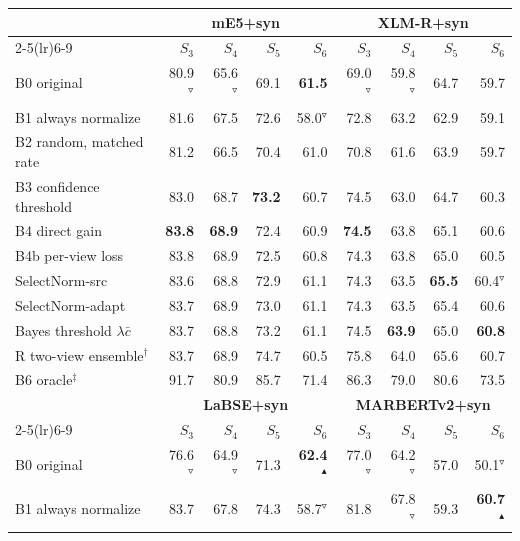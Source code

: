 \begin{tabular}{@{}lrrrrrrrr@{}}\toprule
 & \multicolumn{4}{c}{\textbf{mE5+syn}} & \multicolumn{4}{c}{\textbf{XLM-R+syn}}\\
\cmidrule(lr){2-5}\cmidrule(lr){6-9}
 & $S_3$ & $S_4$ & $S_5$ & $S_6$ & $S_3$ & $S_4$ & $S_5$ & $S_6$\\\midrule
B0 original & 80.9$^{\triangledown}$ & 65.6$^{\triangledown}$ & 69.1 & \textbf{61.5} & 69.0$^{\triangledown}$ & 59.8$^{\triangledown}$ & 64.7 & 59.7\\
B1 always normalize & 81.6 & 67.5 & 72.6 & 58.0$^{\triangledown}$ & 72.8 & 63.2 & 62.9 & 59.1\\
B2 random, matched rate & 81.2 & 66.5 & 70.4 & 61.0 & 70.8 & 61.6 & 63.9 & 59.7\\
B3 confidence threshold & 83.0 & 68.7 & \textbf{73.2} & 60.7 & 74.5 & 63.0 & 64.7 & 60.3\\
B4 direct gain & \textbf{83.8} & \textbf{68.9} & 72.4 & 60.9 & \textbf{74.5} & 63.8 & 65.1 & 60.6\\
B4b per-view loss & 83.8 & 68.9 & 72.5 & 60.8 & 74.3 & 63.8 & 65.0 & 60.5\\
SelectNorm-src & 83.6 & 68.8 & 72.9 & 61.1 & 74.3 & 63.5 & \textbf{65.5} & 60.4$^{\triangledown}$\\
\rowcolor{black!6}SelectNorm-adapt & 83.7 & 68.9 & 73.0 & 61.1 & 74.3 & 63.5 & 65.4 & 60.6\\
\quad Bayes threshold $\lambda\bar c$ & 83.7 & 68.8 & 73.2 & 61.1 & 74.5 & \textbf{63.9} & 65.0 & \textbf{60.8}\\
\addlinespace[2pt]
R two-view ensemble$^\dagger$ & 83.7 & 68.9 & 74.7 & 60.5 & 75.8 & 64.0 & 65.6 & 60.7\\
B6 oracle$^\ddagger$ & 91.7 & 80.9 & 85.7 & 71.4 & 86.3 & 79.0 & 80.6 & 73.5\\
\midrule[\heavyrulewidth]
 & \multicolumn{4}{c}{\textbf{LaBSE+syn}} & \multicolumn{4}{c}{\textbf{MARBERTv2+syn}}\\
\cmidrule(lr){2-5}\cmidrule(lr){6-9}
 & $S_3$ & $S_4$ & $S_5$ & $S_6$ & $S_3$ & $S_4$ & $S_5$ & $S_6$\\\midrule
B0 original & 76.6$^{\triangledown}$ & 64.9$^{\triangledown}$ & 71.3 & \textbf{62.4}$^{\blacktriangle}$ & 77.0$^{\triangledown}$ & 64.2$^{\triangledown}$ & 57.0 & 50.1$^{\triangledown}$\\
B1 always normalize & 83.7 & 67.8 & 74.3 & 58.7$^{\triangledown}$ & 81.8 & 67.8$^{\triangledown}$ & 59.3 & \textbf{60.7}$^{\blacktriangle}$\\

\end{tabular}
